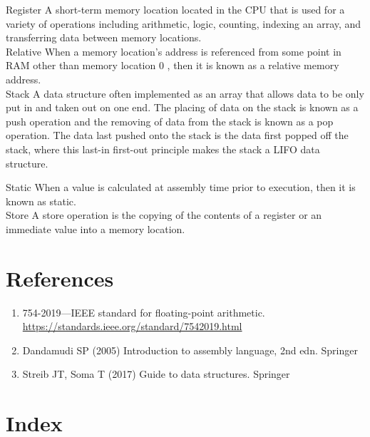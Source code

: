 \documentclass[10pt]{book}
\begin{document}
Register A short-term memory location located in the CPU that is used for a variety of operations including arithmetic, logic, counting, indexing an array, and transferring data between memory locations.\\
Relative When a memory location's address is referenced from some point in RAM other than memory location 0 , then it is known as a relative memory address.\\
Stack A data structure often implemented as an array that allows data to be only put in and taken out on one end. The placing of data on the stack is known as a push operation and the removing of data from the stack is known as a pop operation. The data last pushed onto the stack is the data first popped off the stack, where this last-in first-out principle makes the stack a LIFO data structure.

Static When a value is calculated at assembly time prior to execution, then it is known as static.\\

Store A store operation is the copying of the contents of a register or an immediate value into a memory location.


\section*{References}
\begin{enumerate}
  \item 754-2019—IEEE standard for floating-point arithmetic. \href{https://standards.ieee.org/standard/7542019.html}{https://standards.ieee.org/standard/7542019.html}
  \item Dandamudi SP (2005) Introduction to assembly language, 2nd edn. Springer
  \item Streib JT, Soma T (2017) Guide to data structures. Springer
\end{enumerate}

\section*{Index}
\end{document}
